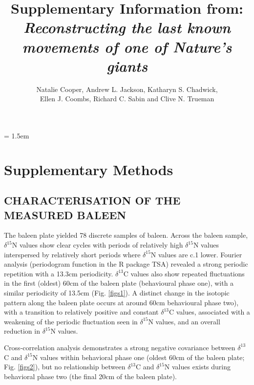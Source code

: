 \documentclass[a4paper,12pt]{article}
\title{Supplementary Information from:\\
\textit{Reconstructing the last known movements of one of Nature's giants}}
\author{Natalie Cooper, Andrew L. Jackson, Katharyn S. Chadwick,\\ 
Ellen J. Coombs, Richard C. Sabin and Clive N. Trueman}
\date{}
\begin{document}

\maketitle

\parindent = 1.5em
\addtolength{\parskip}{.3em}


\section*{Supplementary Methods}
 
\subsection*{CHARACTERISATION OF THE MEASURED BALEEN}
The baleen plate yielded 78 discrete samples of baleen. 
Across the baleen sample, $\delta^{15}$N values show clear cycles with periods of relatively high $\delta^{15}$N values interspersed by relatively short periods where $\delta^{15}$N values are c.1\text{\textperthousand} lower. 
Fourier analysis (periodogram function in the R package TSA\cite{Chan:2012aa}) revealed a strong periodic repetition with a 13.3cm periodicity. 
$\delta^{13}$C values also show repeated fluctuations in the first (oldest) 60cm of the baleen plate (behavioural phase one), with a similar periodicity of 13.5cm (Fig. \ref{figs1}). 
A distinct change in the isotopic pattern along the baleen plate occurs at around 60cm behavioural phase two), with a transition to relatively positive and constant $\delta^{13}$C values, associated with a weakening of the periodic fluctuation seen in $\delta^{15}$N values, and an overall reduction in $\delta^{15}$N values.

 
Cross-correlation analysis demonstrates a strong negative covariance between $\delta^{13}$C and $\delta^{15}$N values within behavioral phase one (oldest 60cm of the baleen plate; Fig. \ref{figs2}), but no relationship between $\delta^{13}$C and $\delta^{15}$N values exists during behavioral phase two (the final 20cm of the baleen plate). 
\end{document}
